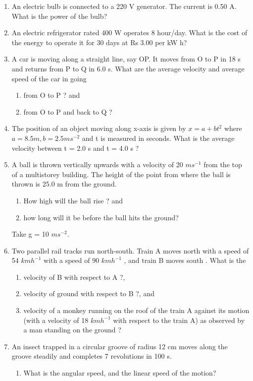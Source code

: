 \begin{enumerate}[label=\arabic*.,ref=\thesection.\theenumi]
\item  An electric bulb is connected to a 220 V generator. The current is 0.50 A. What is the power of the bulb?
\item  An electric refrigerator rated 400 W operates 8 hour/day. What is the cost of the energy to operate it for 30 days at Rs 3.00 per kW h?
\item  A car is moving along a straight line, say OP. It moves from O to P in 18 s and returns from P to Q in 6.0 s. What are the average velocity and average speed of the car in going 
\begin{enumerate}
\item  from O to P ? and 
\item  from O to P and back to Q ?
\end{enumerate}
\item The position of an object moving along x-axis is given by $x = a + bt^2$ where $a = 8.5 m, b = 2.5 m s^{-2}$ and t is
measured in seconds.  What is the average velocity between t = 2.0 s and t = 4.0 s ?
\item  A ball is thrown vertically upwards with a velocity of 20 $ms^{-1}$ from the top of a multistorey building. The height of the point from where the ball is thrown is 25.0 m from the ground. 
\begin{enumerate}
\item  How high will the ball rise ? and 
\item  how long will it be before the ball hits the ground?
\end{enumerate} 
Take g = 10 $ms^{-2}$.
\item Two parallel rail tracks run north-south. Train A moves north with a speed of 54 $km h^{-1}$
with a speed of 90 $km h^{-1}$
, and train B moves south . What is the
\begin{enumerate}
\item  velocity of B with respect to A ?, 
\item  velocity of ground with respect to B ?, and
\item  velocity of a monkey running on the roof of the train A against its motion (with a velocity of 18 $km h^{-1}$
with
respect to the train A) as observed by a man standing on the ground ?
\end{enumerate}
\item An insect trapped in a circular groove of radius 12 cm moves along the groove steadily and completes 7 revolutions in 100 s. 
\begin{enumerate}
\item  What is the angular speed, and the linear speed of the motion? 

\end{enumerate}
\end{enumerate}
